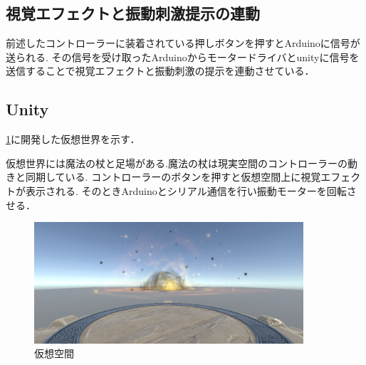 \subsection{視覚エフェクトと振動刺激提示の連動}
前述したコントローラーに装着されている押しボタンを押すとArduinoに信号が送られる.
その信号を受け取ったArduinoからモータードライバとunityに信号を送信することで視覚エフェクトと振動刺激の提示を連動させている．

\subsection{Unity}
\ref{virtualworld}に開発した仮想世界を示す．

仮想世界には魔法の杖と足場がある.魔法の杖は現実空間のコントローラーの動きと同期している.
コントローラーのボタンを押すと仮想空間上に視覚エフェクトが表示される.
そのときArduinoとシリアル通信を行い振動モーターを回転させる．

\begin{figure}[h]
\centering
\includegraphics[clip,width=10cm]{fig/unity.png}
\caption{仮想空間}\label{virtualworld}
\end{figure}